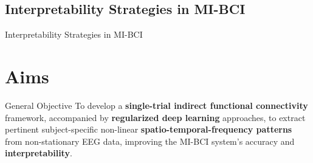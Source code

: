 \documentclass[aspectratio=169]{beamer}
\begin{document}
\subsection{Interpretability Strategies in MI-BCI}

\begin{frame}{Interpretability Strategies in MI-BCI}
    \begin{figure}[!ht]
        \centering
    \end{figure}
\end{frame}

\section{Aims}

\begin{frame}{General Objective}
    To develop a \textbf{single-trial indirect functional connectivity} framework, accompanied by \textbf{regularized deep learning} approaches, to extract pertinent subject-specific non-linear \textbf{spatio-temporal-frequency patterns} from non-stationary EEG data, improving the MI-BCI system's accuracy and \textbf{interpretability}.
\end{frame}
\end{document}
